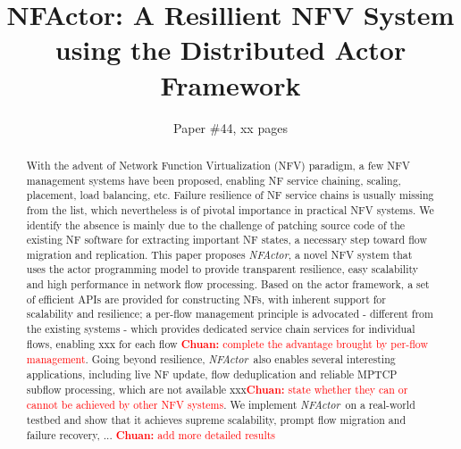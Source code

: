 \documentclass{sig-alternate-10pt}
\def\nfactor{\textit{NFActor}}
\newcommand{\chuan}[1]{\textcolor{red}{{\bf Chuan:} #1}}
\begin{document}
\title{\Large \bf NFActor: A Resillient NFV System using the Distributed Actor Framework}


\author{
Paper \#44, xx pages
}

\maketitle

\begin{abstract}

With the advent of Network Function Virtualization (NFV) paradigm, a few NFV management systems have been proposed, enabling  NF service chaining, scaling, placement, load balancing, etc. Failure resilience of NF service chains is usually missing from the list, which nevertheless is of pivotal importance in practical NFV systems. We identify the absence is mainly due to the challenge of patching source code of the existing NF software for extracting important NF states, a necessary step toward flow migration and replication. %
 This paper proposes \nfactor, a novel NFV system that uses the actor programming model to provide transparent resilience, easy scalability and high performance in network flow processing. Based on the actor framework, a set of efficient APIs are provided for constructing NFs, with inherent support for scalability and resilience; a per-flow management principle is advocated - different from the existing systems - which provides dedicated service chain services for individual flows, enabling xxx for each flow \chuan{complete the advantage brought by per-flow management}. %
Going beyond resilience, \nfactor~also enables several interesting applications, including live NF update, flow deduplication and reliable MPTCP subflow processing, which are not available xxx\chuan{state whether they can or cannot be achieved by other NFV systems}. We implement \nfactor~on a real-world testbed and show that it achieves supreme scalability, prompt flow migration and failure recovery, ... \chuan{add more detailed results}

 



\end{abstract}
\end{document}
